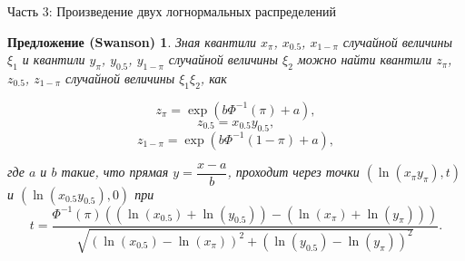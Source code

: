 \documentclass[ucs, notheorems, handout]{beamer}
\newtheorem{proposition}[theorem]{Предложение (Swanson)}
\begin{document}
	
	\begin{frame}{Часть 3: Произведение двух логнормальных распределений}
		
		\begin{proposition}
			Зная квантили $x_{\pi}$, $x_{0.5}$, $x_{1-\pi}$ случайной величины $\xi_{1}$ и квантили $y_{\pi}$, $y_{0.5}$, $y_{1-\pi}$ случайной величины $\xi_{2}$ можно найти квантили $z_{\pi}$, $z_{0.5}$, $z_{1-\pi}$ случайной величины $\xi_{1}\xi_{2}$, как
			
			\begin{equation*}
				z_{\pi}=\exp(b\Phi^{-1}(\pi)+a),
			\end{equation*}
			\begin{equation*}
				z_{0.5}=x_{0.5}y_{0.5},
			\end{equation*}
			\begin{equation*}
				z_{1-\pi}=\exp(b\Phi^{-1}(1-\pi)+a),
			\end{equation*}
			
			где $a$ и $b$ такие, что прямая $y=\dfrac{x-a}{b}$, проходит через точки $(\ln(x_{\pi}y_{\pi}), t)$ и $(\ln(x_{0.5}y_{0.5}),0)$ при
			\begin{equation*}
				t = \frac{\Phi^{-1}(\pi)((\ln(x_{0.5})+\ln(y_{0.5}))-(\ln(x_{\pi})+\ln(y_{\pi})))}{\sqrt{(\ln(x_{0.5})-\ln(x_{\pi}))^{2}+(\ln(y_{0.5})-\ln(y_{\pi}))^{2}}}. 
			\end{equation*}
		\end{proposition}
	
	
	\end{frame}
	
\end{document}
